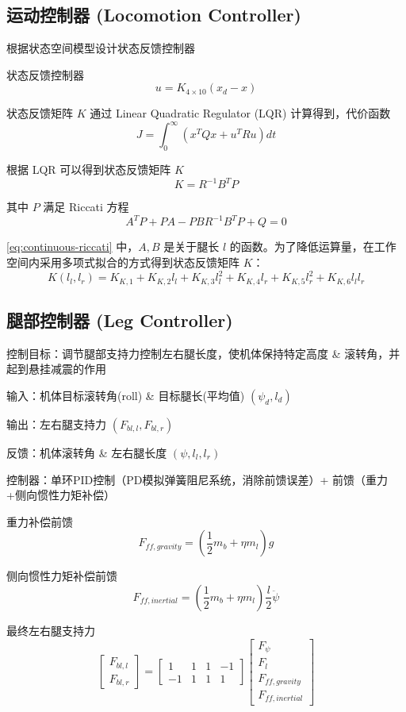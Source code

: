 \subsection{运动控制器 (Locomotion Controller)}
根据状态空间模型设计状态反馈控制器

状态反馈控制器
\begin{equation}
u = K_{4 \times 10}(x_d - x) 
\end{equation}

状态反馈矩阵 $K$ 通过 Linear Quadratic Regulator (LQR) 计算得到，代价函数
\begin{equation}
J = \int_{0}^{\infty} (x^T Q x + u^T R u) dt 
\end{equation}

根据 LQR 可以得到状态反馈矩阵 $K$
\begin{equation}
K = R^{-1} B^T P 
\end{equation}

其中 $P$ 满足 Riccati 方程
\begin{equation}
A^T P + P A - P B R^{-1} B^T P + Q = 0 
\label{eq:continuous-riccati}
\end{equation}

\eqref{eq:continuous-riccati} 中，$A, B$ 是关于腿长 $l$ 的函数。为了降低运算量，在工作空间内采用多项式拟合的方式得到状态反馈矩阵 $K$：
\begin{equation}
K(l_l, l_r) = K_{K,1} + K_{K,2} l_l + K_{K,3} l_l^2 + K_{K,4} l_r + K_{K,5} l_r^2 + K_{K,6} l_l l_r 
\end{equation}

\subsection{腿部控制器 (Leg Controller)}
控制目标：调节腿部支持力控制左右腿长度，使机体保持特定高度 \& 滚转角，并起到悬挂减震的作用

输入：机体目标滚转角(roll) \& 目标腿长(平均值) $(\psi_d, l_d)$

输出：左右腿支持力 $(F_{bl,l}, F_{bl,r})$

反馈：机体滚转角 \& 左右腿长度 $(\psi, l_l, l_r)$

控制器：单环PID控制（PD模拟弹簧阻尼系统，消除前馈误差）+ 前馈（重力+侧向惯性力矩补偿）

重力补偿前馈
\begin{equation}
F_{ff,gravity} = \left(\frac{1}{2}m_b + \eta m_l\right)g 
\end{equation}

侧向惯性力矩补偿前馈
\begin{equation}
F_{ff,inertial} = \left(\frac{1}{2}m_b + \eta m_l\right) \frac{l}{2} \ddot{\psi} 
\end{equation}

最终左右腿支持力
\begin{equation}
\begin{bmatrix}
F_{bl,l} \\
F_{bl,r}
\end{bmatrix} = 
\begin{bmatrix}
1 & 1 & 1 & -1 \\
-1 & 1 & 1 & 1
\end{bmatrix}
\begin{bmatrix}
F_\psi \\
F_l \\
F_{ff,gravity} \\
F_{ff,inertial}
\end{bmatrix}
\end{equation}
